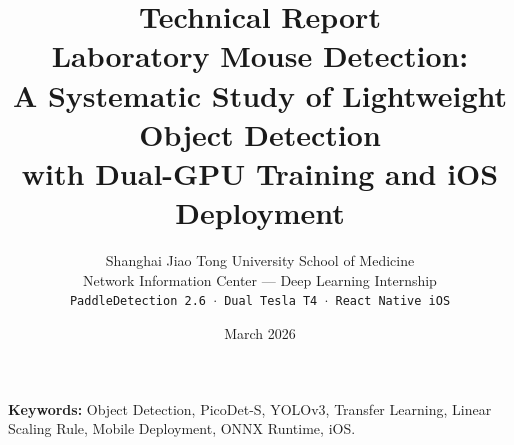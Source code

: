 \documentclass[12pt,a4paper]{article}
\title{
  \vspace{-1cm}
  {\large Technical Report}\\[0.4em]
  \textbf{\LARGE Laboratory Mouse Detection:\\[0.2em]
  A Systematic Study of Lightweight Object Detection\\[0.2em]
  with Dual-GPU Training and iOS Deployment}
}
\author{
  Shanghai Jiao Tong University School of Medicine\\
  Network Information Center --- Deep Learning Internship\\[0.3em]
  \texttt{PaddleDetection 2.6 $\cdot$ Dual Tesla T4 $\cdot$ React Native iOS}
}
\date{March 2026}
\begin{document}
\maketitle
\thispagestyle{empty}

\begin{abstract}

\end{abstract}

\vspace{0.5em}
\noindent\textbf{Keywords:} Object Detection, PicoDet-S, YOLOv3, Transfer Learning,
Linear Scaling Rule, Mobile Deployment, ONNX Runtime, iOS.

\newpage
\tableofcontents
\newpage










\newpage


\end{document}

